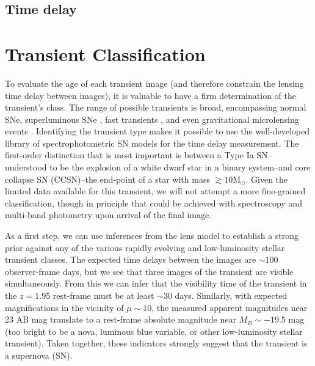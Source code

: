 \documentclass[twocolumn]{aastex63}
\begin{document}
\subsection{Time delay}
\label{ss:timedelay}

\section{Transient Classification}
\label{s:classifiation}


To evaluate the age of each transient image (and therefore constrain the lensing time delay between images), it is valuable to have a firm determination of the transient's class.  The range of possible transients is broad, encompassing normal SNe, superluminous SNe \citep{galyam_luminous_2019}, fast transients \citep{berger_fast_2013, drout_rapidly_2014}, and even gravitational microlensing events \citep{rodney_two_2018,kelly_extreme_2018}.  Identifying the transient type makes it possible to use the well-developed library of spectrophotometric SN models \citep[e.g.][]{kessler_models_2019} for the time delay measurement. 
 The first-order distinction that is most important is between a Type Ia SN--understood to be the explosion of a white dwarf star in a binary system--and core collapse SN (CCSN)--the end-point of a star with mass $\gtrsim 10$M$_{\odot}$.  Given the limited data available for this transient, we will not attempt a more fine-grained classification, though in principle that could be achieved with spectroscopy and multi-band photometry upon arrival of the final image.  
 


As a first step, we can use inferences from the lens model to establish a strong prior against any of the various rapidly evolving and low-luminosity stellar transient classes.  
The expected time delays between the images are $\sim100$ observer-frame days, 
but we see that three images of the transient are visible simultaneously.
From this we can infer that the visibility time of the transient in the $z=1.95$ rest-frame must be at least $\sim$30 days. 
Similarly, with expected magnifications in the vicinity of $\mu\sim10$, the measured apparent magnitudes near 23 AB mag translate to a rest-frame absolute magnitude near $M_B \sim-19.5$ mag (too bright to be a nova, luminous blue variable, or other low-luminosity stellar transient).
Taken together, these indicators strongly suggest that the transient is a supernova (SN). 
\end{document}
